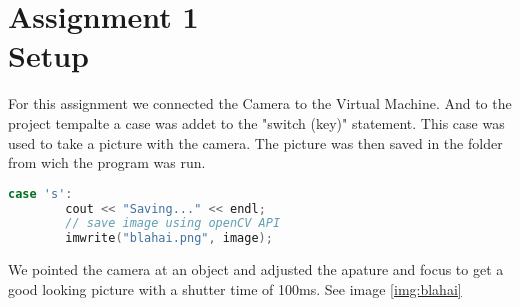\section {Assignment 1 \\ {Setup}}
\label {sec:assignment_1}

For this assignment we connected the Camera to the Virtual Machine. And to the project tempalte a case was addet to the "switch (key)" statement. This case was used to take a picture with the camera. The picture was then saved in the folder from wich the program was run.

\begin{lstlisting}[language=C, caption=save image to file]
    case 's':
        cout << "Saving..." << endl;
        // save image using openCV API
        imwrite("blahai.png", image);
\end{lstlisting}

We pointed the camera at an object and adjusted the apature and focus to get a good looking picture with a shutter time of 100ms. See image \ref{img:blahai}
